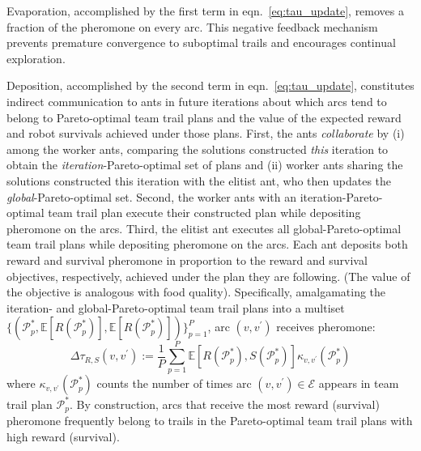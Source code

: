 \documentclass[fleqn,10pt,lineno]{wlpeerj}
\begin{document}
Evaporation, accomplished by the first term in eqn.~\ref{eq:tau_update}, removes a fraction of the pheromone on every arc. This negative feedback mechanism prevents premature convergence to suboptimal trails and encourages continual exploration.

Deposition, accomplished by the second term in eqn.~\ref{eq:tau_update}, constitutes indirect communication to ants in future iterations about which arcs tend to belong to Pareto-optimal team trail plans and the value of the expected reward and robot survivals achieved under those plans.
First, the ants \emph{collaborate} by 
(i) among the worker ants, comparing the solutions constructed \emph{this} iteration to obtain the \emph{iteration}-Pareto-optimal set of plans
and 
(ii) worker ants sharing the solutions constructed this iteration with the elitist ant, who then updates the \emph{global}-Pareto-optimal set.
Second, the worker ants with an iteration-Pareto-optimal team trail plan execute their constructed plan while depositing pheromone on the arcs.
Third, the elitist ant executes all global-Pareto-optimal team trail plans while depositing pheromone on the arcs. Each ant deposits both reward and survival pheromone in proportion to the reward and survival objectives, respectively, achieved under the plan they are following. (The value of the objective is analogous with food quality). 
Specifically, amalgamating the iteration- and global-Pareto-optimal team trail plans into a multiset $\{(\mathcal{P}_p^*, \mathbb{E}[R(\mathcal{P}_p^*)], \mathbb{E}[R(\mathcal{P}_p^*)])\}_{p=1}^P$, arc $(v, v^\prime)$ receives pheromone:
\begin{equation}
	 \Delta \tau_{R,S}(v, v^\prime) := 
	\frac{1}{P} \sum_{p=1}^{P} \mathbb{E}[R(\mathcal{P}^*_p), S(\mathcal{P}^*_p)] 
	\kappa_{v, v^\prime}(\mathcal{P}^*_p) 
\end{equation}
where $\kappa_{v, v^\prime}(\mathcal{P}^*_p)$ counts the number of times arc $(v, v^\prime) \in \mathcal{E}$ appears in team trail plan $\mathcal{P}^*_p$.
By construction, arcs that receive the most reward (survival) pheromone frequently belong to trails in the Pareto-optimal team trail plans with high reward (survival).
\end{document}
